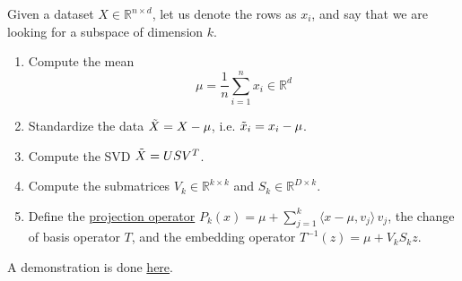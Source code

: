   \begin{algo} 
    Given a dataset $X \in \mathbb{R}^{n \times d}$, let us denote the rows as $x_i$, and say that we are looking for a subspace of dimension $k$. 
    \begin{enumerate}
      \item Compute the mean 
      \begin{equation}
        \mu = \frac{1}{n} \sum_{i=1}^n x_i  \in \mathbb{R}^d
      \end{equation} 

      \item Standardize the data $\Tilde{X} = X - \mu$, i.e. $\Tilde{x}_i = x_i - \mu$.  

      \item Compute the SVD $\Tilde{X} = U S V^T$.

      \item Compute the submatrices $V_k \in \mathbb{R}^{k \times k}$ and $S_k \in \mathbb{R}^{D \times k}$. 

      \item Define the \hyperref[def:projection-operator]{projection operator} $P_k (x) = \mu + \sum_{j=1}^k \langle x - \mu, v_j \rangle \, v_j$, the change of basis operator $T$, and the embedding operator $T^{-1} (z) = \mu + V_k S_k z$. 
    \end{enumerate} 
    A demonstration is done \href{code/pca.html}{here}.
  \end{algo}


